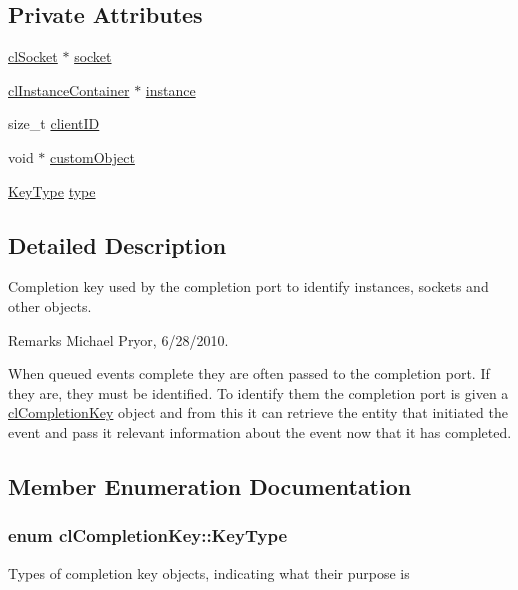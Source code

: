 \subsection*{Private Attributes}
\begin{DoxyCompactItemize}
\item 
\hyperlink{classcl_socket}{clSocket} $\ast$ \hyperlink{classcl_completion_key_a96e8a44f37704779a1715f72fd712da2}{socket}
\item 
\hyperlink{classcl_instance_container}{clInstanceContainer} $\ast$ \hyperlink{classcl_completion_key_aa35aa701d8a009f709509ba26ead3275}{instance}
\item 
size\_\-t \hyperlink{classcl_completion_key_a512eecc783be96d6afe9a75c05c1ff18}{clientID}
\item 
void $\ast$ \hyperlink{classcl_completion_key_ab1ef70c4d8194b9fd32f502dead2a371}{customObject}
\item 
\hyperlink{classcl_completion_key_a3a2147c7a8a50fc3333cee949105ab12}{KeyType} \hyperlink{classcl_completion_key_aa63f9e5342dac65b56fab6a424065aa9}{type}
\end{DoxyCompactItemize}


\subsection{Detailed Description}
Completion key used by the completion port to identify instances, sockets and other objects. \begin{DoxyRemark}{Remarks}
Michael Pryor, 6/28/2010.
\end{DoxyRemark}
When queued events complete they are often passed to the completion port. If they are, they must be identified. To identify them the completion port is given a \hyperlink{classcl_completion_key}{clCompletionKey} object and from this it can retrieve the entity that initiated the event and pass it relevant information about the event now that it has completed. 

\subsection{Member Enumeration Documentation}
\hypertarget{classcl_completion_key_a3a2147c7a8a50fc3333cee949105ab12}{
\subsubsection[{KeyType}]{\setlength{\rightskip}{0pt plus 5cm}enum {\bf clCompletionKey::KeyType}}}
\label{classcl_completion_key_a3a2147c7a8a50fc3333cee949105ab12}
Types of completion key objects, indicating what their purpose is 


